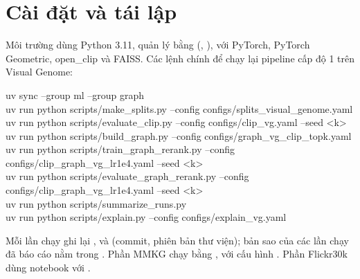 \section{Cài đặt và tái lập}
\label{sec:repro}
Môi trường dùng Python 3.11, quản lý bằng  (, ), với PyTorch, PyTorch Geometric, open\_clip và FAISS. Các lệnh chính để chạy lại pipeline cấp độ 1 trên Visual Genome:

{\footnotesize\ttfamily\raggedright
uv sync --group ml --group graph\\
uv run python scripts/make\_splits.py --config configs/splits\_visual\_genome.yaml\\
uv run python scripts/evaluate\_clip.py --config configs/clip\_vg.yaml --seed <k>\\
uv run python scripts/build\_graph.py --config configs/graph\_vg\_clip\_topk.yaml\\
uv run python scripts/train\_graph\_rerank.py --config configs/clip\_graph\_vg\_lr1e4.yaml --seed <k>\\
uv run python scripts/evaluate\_graph\_rerank.py --config configs/clip\_graph\_vg\_lr1e4.yaml --seed <k>\\
uv run python scripts/summarize\_runs.py\\
uv run python scripts/explain.py --config configs/explain\_vg.yaml\par}

\smallskip
Mỗi lần chạy ghi lại ,  và  (commit, phiên bản thư viện); bản sao của các lần chạy đã báo cáo nằm trong . Phần MMKG chạy bằng ,  với cấu hình . Phần Flickr30k dùng notebook  với .

